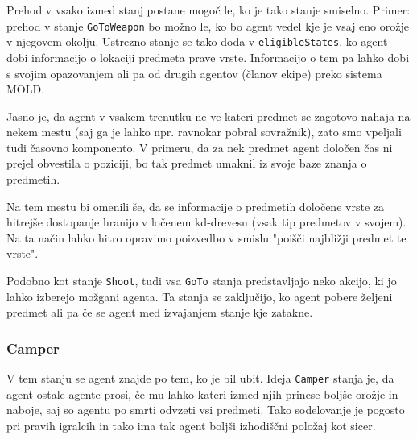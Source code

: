\documentclass[a4paper,10pt]{article}
\begin{document}
Prehod v vsako izmed stanj postane mogoč le, ko je tako stanje smiselno. Primer: prehod v stanje \verb+GoToWeapon+ bo možno le, ko bo agent vedel kje je vsaj eno orožje v njegovem okolju. Ustrezno stanje se tako doda v \verb+eligibleStates+, ko agent dobi informacijo o lokaciji predmeta prave vrste. Informacijo o tem pa lahko dobi s svojim opazovanjem ali pa od drugih agentov (članov ekipe) preko sistema MOLD.

Jasno je, da agent v vsakem trenutku ne ve kateri predmet se zagotovo nahaja na nekem mestu (saj ga je lahko npr. ravnokar pobral sovražnik), zato smo vpeljali tudi časovno komponento. V primeru, da za nek predmet agent določen čas ni prejel obvestila o poziciji, bo tak predmet umaknil iz svoje baze znanja o predmetih.

Na tem mestu bi omenili še, da se informacije o predmetih določene vrste za hitrejše dostopanje hranijo v ločenem kd-drevesu (vsak tip predmetov v svojem). Na ta način lahko hitro opravimo poizvedbo v smislu "poišči najbližji predmet te vrste".

Podobno kot stanje \verb+Shoot+, tudi vsa \verb+GoTo+ stanja predstavljajo neko akcijo, ki jo lahko izberejo možgani agenta. Ta stanja se zaključijo, ko agent pobere željeni predmet ali pa če se agent med izvajanjem stanje kje zatakne.

\subsubsection{Camper} \label{sec:states-camper}
V tem stanju se agent znajde po tem, ko je bil ubit. Ideja \verb+Camper+ stanja je, da agent ostale agente prosi, če mu lahko kateri izmed njih prinese boljše orožje in naboje, saj so agentu po smrti odvzeti vsi predmeti. Tako sodelovanje je pogosto pri pravih igralcih in tako ima tak agent boljši izhodiščni položaj kot sicer.
\end{document}
